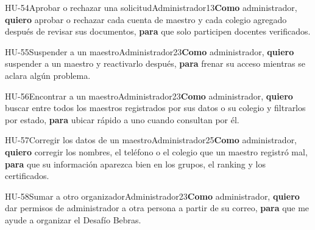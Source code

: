 \begin{historia}[1]{HU-54}{Aprobar o rechazar una solicitud}{Administrador}{1}{3}{\textbf{Como} administrador, \textbf{quiero} aprobar o rechazar cada cuenta de maestro y cada colegio agregado después de revisar sus documentos, \textbf{para} que solo participen docentes verificados.}
\end{historia}

\begin{historia}[1]{HU-55}{Suspender a un maestro}{Administrador}{2}{3}{\textbf{Como} administrador, \textbf{quiero} suspender a un maestro y reactivarlo después, \textbf{para} frenar su acceso mientras se aclara algún problema.}
\end{historia}

\begin{historia}[1]{HU-56}{Encontrar a un maestro}{Administrador}{2}{3}{\textbf{Como} administrador, \textbf{quiero} buscar entre todos los maestros registrados por sus datos o su colegio y filtrarlos por estado, \textbf{para} ubicar rápido a uno cuando consultan por él.}
\end{historia}

\begin{historia}[1]{HU-57}{Corregir los datos de un maestro}{Administrador}{2}{5}{\textbf{Como} administrador, \textbf{quiero} corregir los nombres, el teléfono o el colegio que un maestro registró mal, \textbf{para} que su información aparezca bien en los grupos, el ranking y los certificados.}
\end{historia}

\begin{historia}[1]{HU-58}{Sumar a otro organizador}{Administrador}{2}{3}{\textbf{Como} administrador, \textbf{quiero} dar permisos de administrador a otra persona a partir de su correo, \textbf{para} que me ayude a organizar el Desafío Bebras.}
\end{historia}

